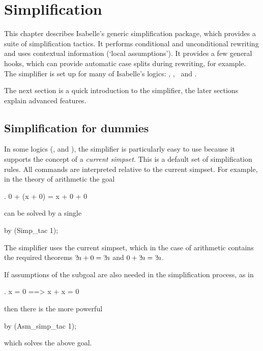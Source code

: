 \chapter{Simplification}
\label{chap:simplification}

This chapter describes Isabelle's generic simplification package, which
provides a suite of simplification tactics.  It performs conditional and
unconditional rewriting and uses contextual information (`local
assumptions').  It provides a few general hooks, which can provide
automatic case splits during rewriting, for example.  The simplifier is set
up for many of Isabelle's logics: \FOL, \ZF, \HOL\ and \HOLCF.

The next section is a quick introduction to the simplifier, the later
sections explain advanced features.

\section{Simplification for dummies}
\label{sec:simp-for-dummies}

In some logics (\FOL, {\HOL} and \ZF), the simplifier is particularly easy to
use because it supports the concept of a {\em current
  simpset}.  This is a default set of simplification
rules.  All commands are interpreted relative to the current simpset.  For
example, in the theory of arithmetic the goal
\begin{ttbox}
{. 0 + (x + 0) = x + 0 + 0}
\end{ttbox}
can be solved by a single
\begin{ttbox}
by (Simp_tac 1);
\end{ttbox}
The simplifier uses the current simpset, which in the case of arithmetic
contains the required theorems ${?\!n}+0 = {?\!n}$ and $0+{?\!n} =
{?\!n}$.

If assumptions of the subgoal are also needed in the simplification
process, as in
\begin{ttbox}
{. x = 0 ==> x + x = 0}
\end{ttbox}
then there is the more powerful
\begin{ttbox}
by (Asm_simp_tac 1);
\end{ttbox}
which solves the above goal.


